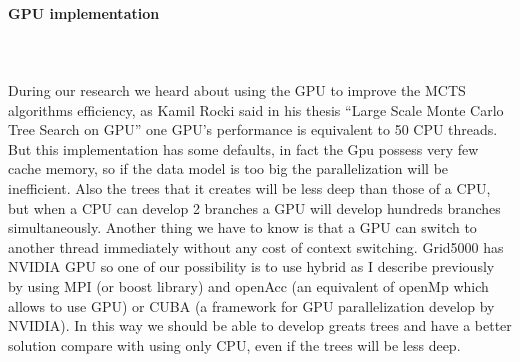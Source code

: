 \paragraph{GPU implementation}\mbox{}\\\mbox{}\\
	During our research we heard about using the GPU to improve the MCTS algorithms efficiency, as Kamil Rocki said in his thesis “Large Scale Monte Carlo Tree Search on GPU” one GPU's performance is equivalent to 50 CPU threads. But this implementation has some defaults, in fact the Gpu possess very few cache memory, so if the data model is too big the parallelization will be inefficient. Also the trees that it creates will be less deep than those of a CPU, but when a CPU can develop 2 branches a GPU will develop hundreds branches simultaneously. Another thing we have to know is that a GPU can switch to another thread immediately without any cost of context switching. 
	Grid5000 has NVIDIA GPU so one of our possibility is to use hybrid as I describe previously by using MPI (or boost library) and openAcc (an equivalent of openMp which allows to use GPU) or CUBA (a framework for GPU parallelization develop by NVIDIA). In this way we should be able to develop greats trees and have a better solution compare with using only CPU, even if the trees will be less deep.